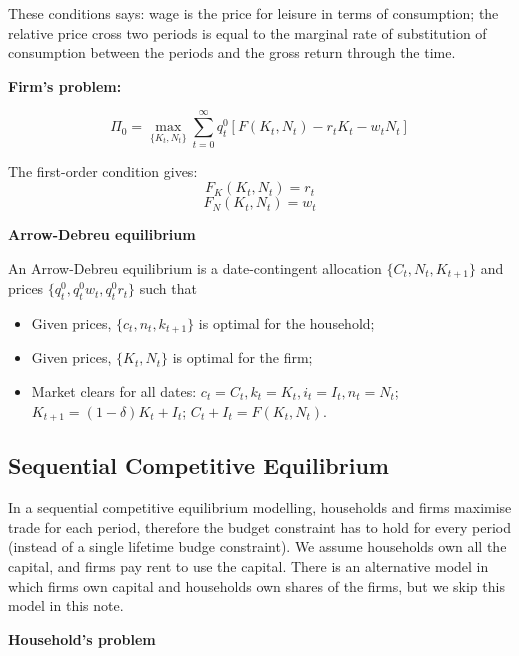 \documentclass[10pt,a4]{article}
\begin{document}
These conditions says: wage is the price for leisure in terms of
consumption; the relative price cross two periods is equal to the
marginal rate of substitution of consumption between the periods and the
gross return through the time.~

\par\null

\textbf{Firm's problem:}

\par\null

$$\Pi_0 = \max_{\{K_t,N_t\}} \sum_{t=0}^{\infty} q_t^0 [F(K_t, N_t) - r_tK_t - w_tN_t]$$



The first-order condition gives:
$$ F_K(K_t, N_t) = r_t $$
$$ F_N(K_t, N_t) = w_t $$

\textbf{Arrow-Debreu equilibrium}

\textbf{}

An Arrow-Debreu equilibrium is a date-contingent allocation $\{C_t, N_t, K_{t+1}\}$ and prices $\{q_t^0, q_t^0w_t, q_t^0r_t\}$ such that 
\begin{itemize}
\item Given prices, $\{c_t, n_t, k_{t+1}\}$ is optimal for the household;
\item Given prices, $\{K_t, N_t\}$ is optimal for the firm;
\item Market clears for all dates: $c_t = C_t, k_t=K_t, i_t=I_t, n_t=N_t$; $K_{t+1}=(1-\delta)K_t + I_t$; $C_t+I_t=F(K_t,N_t)$.
\end{itemize}

\subsection{Sequential Competitive
Equilibrium}

{\label{273711}}

In a sequential competitive equilibrium modelling, households and firms
maximise trade for each period, therefore the budget constraint has to
hold for every period (instead of a single lifetime budge constraint).
We assume households own all the capital, and firms pay rent to use the
capital. There is an alternative model in which firms own capital and
households own shares of the firms, but we skip this model in this
note.~

\par\null

\textbf{Household's problem}

\textbf{}
\end{document}
